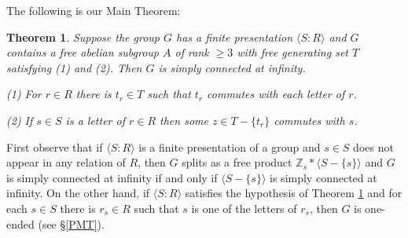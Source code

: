 \documentclass[12pt]{article}
\newtheorem{theorem}{Theorem}[section]
\newtheorem{remark}[theorem]{Remark}
\numberwithin{equation}{section}
\begin{document}
The following is our Main Theorem:

\begin{theorem}\label{Main} Suppose the group $G$ has a finite presentation $\langle S:R\rangle$ and $G$ contains a free abelian subgroup $A$ of rank $\geq 3$ with free generating set $T$ satisfying (1) and (2). Then $G$ is simply connected at infinity.  

\noindent  (1) For $r\in R$ there is $t_r\in T$ such that $t_r$ commutes with each letter of $r$.

\noindent  (2) If $s\in S$ is a letter of $r\in R$ then some $z\in T-\{t_r\}$ commutes with $s$. 
\end{theorem}
First observe that if $\langle S:R\rangle$ is a finite presentation of a group and $s\in S$ does not appear in any relation of $R$, then $G$ splits as a free product $\mathbb Z_s\ast \langle S-\{s\}\rangle$ and $G$ is simply connected at infinity if and only if $\langle S-\{s\}\rangle$ is simply connected at infinity. On the other hand, if $\langle S:R\rangle$ satisfies the hypothesis of Theorem \ref{Main} and for each $s\in S$ there is $r_s\in R$ such that $s$ is one of the letters of $r_s$, then $G$ is one-ended (see \S \ref{PMT}). 
\end{document}
